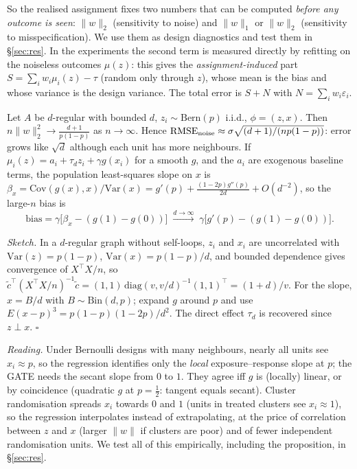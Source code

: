 So the realised assignment fixes two numbers that can be computed \emph{before any outcome is seen}: $\|w\|_2$ (sensitivity to noise) and $\|w\|_1$ or $\|w\|_2$ (sensitivity to misspecification). We use them as design diagnostics and test them in \S\ref{sec:res}. In the experiments the second term is measured directly by refitting on the noiseless outcomes $\mu(z)$: this gives the \emph{assignment-induced} part $S=\sum_iw_i\mu_i(z)-\tau$ (random only through $z$), whose mean is the bias and whose variance is the design variance. The total error is $S+N$ with $N=\sum_iw_i\varepsilon_i$.

\begin{proposition}\label{prop:bern}
Let $A$ be $d$-regular with bounded $d$, $z_i\sim\mathrm{Bern}(p)$ i.i.d., $\phi=(z,x)$. Then $n\|w\|_2^2\to\frac{d+1}{p(1-p)}$ as $n\to\infty$. Hence $\mathrm{RMSE}_{\rm noise}\approx\sigma\sqrt{(d+1)/(np(1-p))}$: error grows like $\sqrt d$ although each unit has more neighbours. If $\mu_i(z)=a_i+\tau_dz_i+\gamma g(x_i)$ for a smooth $g$, and the $a_i$ are exogenous baseline terms, the population least-squares slope on $x$ is $\beta_x=\mathrm{Cov}(g(x),x)/\mathrm{Var}(x)=g'(p)+\tfrac{(1-2p)g''(p)}{2d}+O(d^{-2})$, so the large-$n$ bias is
\[
\mathrm{bias}=\gamma\big[\beta_x-(g(1)-g(0))\big]\;\xrightarrow{d\to\infty}\;\gamma\big[g'(p)-(g(1)-g(0))\big].
\]
\end{proposition}
\emph{Sketch.} In a $d$-regular graph without self-loops, $z_i$ and $x_i$ are uncorrelated with $\mathrm{Var}(z)=p(1-p)$, $\mathrm{Var}(x)=p(1-p)/d$, and bounded dependence gives convergence of $X^\top X/n$, so $\tilde c^\top(X^\top X/n)^{-1}\tilde c=(1,1)\,\mathrm{diag}(v,v/d)^{-1}(1,1)^\top=(1+d)/v$. For the slope, $x=B/d$ with $B\sim\mathrm{Bin}(d,p)$; expand $g$ around $p$ and use $E(x-p)^3=p(1-p)(1-2p)/d^2$. The direct effect $\tau_d$ is recovered since $z\perp x$. \hfill$\square$

\emph{Reading.} Under Bernoulli designs with many neighbours, nearly all units see $x_i\approx p$, so the regression identifies only the \emph{local} exposure--response slope at $p$; the GATE needs the secant slope from $0$ to $1$. They agree iff $g$ is (locally) linear, or by coincidence (quadratic $g$ at $p=\tfrac12$: tangent equals secant). Cluster randomisation spreads $x_i$ towards $0$ and $1$ (units in treated clusters see $x_i\approx1$), so the regression interpolates instead of extrapolating, at the price of correlation between $z$ and $x$ (larger $\|w\|$ if clusters are poor) and of fewer independent randomisation units. We test all of this empirically, including the proposition, in \S\ref{sec:res}.
